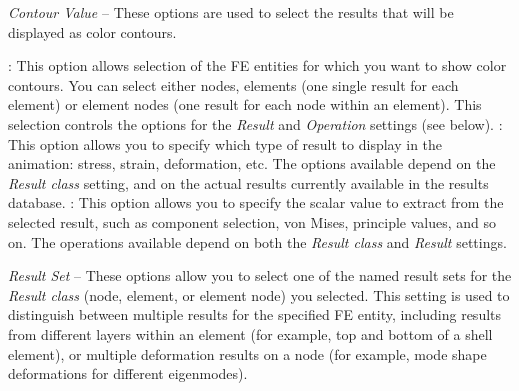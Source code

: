 \vspace{-1mm}
\begin{bulletlist}
\item{\sl Contour Value} --
  These options are used to select the results that will be displayed
  as color contours.

  \begin{itemize}
   :
    This option allows selection of the FE entities for which you want to show
    color contours. You can select either nodes, elements (one single result for
    each element) or element nodes (one result for each node within an element).
    This selection controls the options for the {\sl Result} and {\sl Operation}
    settings (see below).
   :
    This option allows you to specify which type of result to display in the
    animation: stress, strain, deformation, etc. The options available depend on
    the {\sl Result class} setting, and on the actual results currently
    available in the results database.
   :
    This option allows you to specify the scalar value to extract from the
    selected result, such as component selection, von Mises, principle values,
    and so on. The operations available depend on both the {\sl Result class}
    and {\sl Result} settings.
  \end{itemize}


\item{\sl Result Set} --
  These options allow you to select one of the named result sets for the
  {\sl Result class} (node, element, or element node) you selected.
  This setting is used to distinguish between multiple results for the specified
  FE entity, including results from different layers within an element (for
  example, top and bottom of a shell element), or multiple deformation results
  on a node (for example, mode shape deformations for different eigenmodes).


\end{bulletlist}
